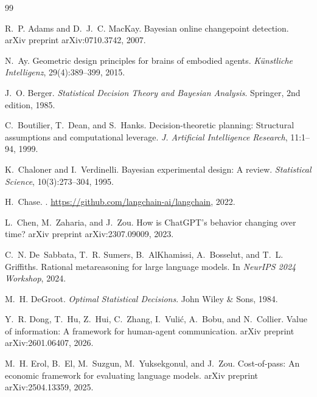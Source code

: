 \documentclass[11pt]{article}
\begin{document}
\begin{thebibliography}{99}

R.~P. Adams and D.~J.~C. MacKay.
\newblock Bayesian online changepoint detection.
\newblock arXiv preprint arXiv:0710.3742, 2007.

N.~Ay.
\newblock Geometric design principles for brains of embodied agents.
\newblock \emph{K{\"u}nstliche Intelligenz}, 29(4):389--399, 2015.

J.~O. Berger.
\newblock \emph{Statistical Decision Theory and Bayesian Analysis}.
\newblock Springer, 2nd edition, 1985.

C.~Boutilier, T.~Dean, and S.~Hanks.
\newblock Decision-theoretic planning: Structural assumptions and computational leverage.
\newblock \emph{J. Artificial Intelligence Research}, 11:1--94, 1999.

K.~Chaloner and I.~Verdinelli.
\newblock Bayesian experimental design: A review.
\newblock \emph{Statistical Science}, 10(3):273--304, 1995.

H.~Chase.
.
\newblock \url{https://github.com/langchain-ai/langchain}, 2022.

L.~Chen, M.~Zaharia, and J.~Zou.
\newblock How is {ChatGPT}'s behavior changing over time?
\newblock arXiv preprint arXiv:2307.09009, 2023.

C.~N. De~Sabbata, T.~R. Sumers, B.~AlKhamissi, A.~Bosselut, and T.~L. Griffiths.
\newblock Rational metareasoning for large language models.
\newblock In \emph{NeurIPS 2024 Workshop}, 2024.

M.~H. DeGroot.
\newblock \emph{Optimal Statistical Decisions}.
\newblock John Wiley \& Sons, 1984.

Y.~R. Dong, T.~Hu, Z.~Hui, C.~Zhang, I.~Vuli\'{c}, A.~Bobu, and N.~Collier.
\newblock Value of information: A framework for human-agent communication.
\newblock arXiv preprint arXiv:2601.06407, 2026.

M.~H. Erol, B.~El, M.~Suzgun, M.~Yuksekgonul, and J.~Zou.
\newblock Cost-of-pass: An economic framework for evaluating language models.
\newblock arXiv preprint arXiv:2504.13359, 2025.


\end{thebibliography}
\end{document}
